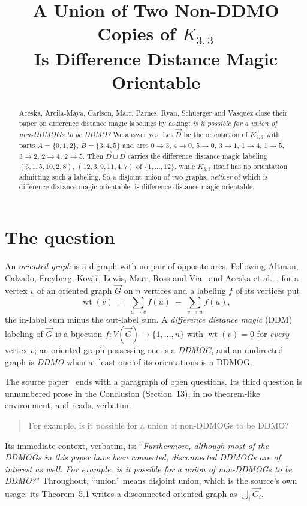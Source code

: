 \documentclass[11pt]{amsart}
\title[A union of two non-DDMO copies of $K_{3,3}$]
{A Union of Two Non-DDMO Copies of $K_{3,3}$\\ Is Difference Distance Magic Orientable}
\date{}
\DeclareMathOperator{\wt}{wt}
\newcommand{\ora}[1]{\overrightarrow{#1}}
\begin{document}
\begin{abstract}
Aceska, Arcila-Maya, Carlson, Marr, Parnes, Ryan, Schuerger and Vasquez close their paper on
difference distance magic labelings by asking: \emph{is it possible for a union of non-DDMOGs
to be DDMO?} We answer yes. Let $\ora{D}$ be the orientation of $K_{3,3}$ with parts
$A=\{0,1,2\}$, $B=\{3,4,5\}$ and arcs
$0\!\to\!3$, $4\!\to\!0$, $5\!\to\!0$, $3\!\to\!1$, $1\!\to\!4$, $1\!\to\!5$,
$3\!\to\!2$, $2\!\to\!4$, $2\!\to\!5$.
Then $\ora{D}\sqcup\ora{D}$ carries the difference distance magic labeling
$(6,1,5,10,2,8)$, $(12,3,9,11,4,7)$ of $\{1,\dots,12\}$, while $K_{3,3}$ itself has no
orientation admitting such a labeling. So a disjoint union of two graphs, \emph{neither} of
which is difference distance magic orientable, is difference distance magic orientable.
\end{abstract}

\maketitle

\section{The question}\label{sec:q}

An \emph{oriented graph} is a digraph with no pair of opposite arcs. Following
Altman, Calzado, Freyberg, Kov\'a\v{r}, Lewis, Marr, Ross and Via~\cite{Altman}
and Aceska et al.~\cite{Source}, for a vertex $v$ of an oriented graph $\ora{G}$ on $n$
vertices and a labeling $f$ of its vertices put
\[
  \wt(v)\;=\;\sum_{u\to v} f(u)\;-\;\sum_{v\to u} f(u),
\]
the in-label sum minus the out-label sum. A \emph{difference distance magic} (DDM) labeling of
$\ora{G}$ is a bijection $f\colon V(\ora{G})\to\{1,\dots,n\}$ with $\wt(v)=0$ for
\emph{every} vertex $v$; an oriented graph possessing one is a \emph{DDMOG}, and an undirected
graph is \emph{DDMO} when at least one of its orientations is a DDMOG.

The source paper~\cite{Source} ends with a paragraph of open questions. Its third question is
unnumbered prose in the Conclusion (Section~13), in no theorem-like environment, and reads,
verbatim:

\begin{quote}
For example, is it possible for a union of non-DDMOGs to be DDMO?
\end{quote}

\noindent
Its immediate context, verbatim, is: ``\emph{Furthermore, although most of the DDMOGs in this
paper have been connected, disconnected DDMOGs are of interest as well. For example, is it
possible for a union of non-DDMOGs to be DDMO?}'' Throughout, ``union'' means disjoint union,
which is the source's own usage: its Theorem~5.1 writes a disconnected oriented graph as
$\bigcup_i\ora{G_i}$.
\end{document}
